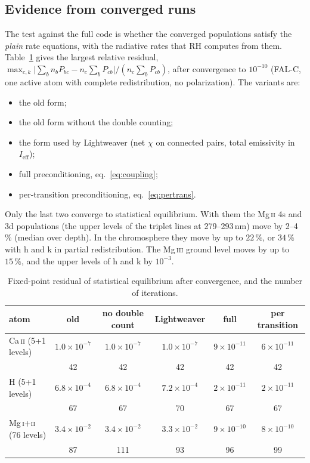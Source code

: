 \documentclass[11pt,a4paper]{article}
\begin{document}
\subsection{Evidence from converged runs}
The test against the full code is whether the converged populations
satisfy the \emph{plain} rate equations, with the radiative rates that
RH computes from them. Table~\ref{tab:coupling} gives the largest
relative residual,
$\max_{c,k}\bigl|\sum_b n_b P_{bc} - n_c\sum_b P_{cb}\bigr|/(n_c\sum_bP_{cb})$,
after convergence to $10^{-10}$ (FAL-C, one active atom with complete
redistribution, no polarization). The variants are:
\begin{itemize}
\item the old form;
\item the old form without the double counting;
\item the form used by Lightweaver (net $\chi$ on connected pairs, total
  emissivity in $I_\text{eff}$);
\item full preconditioning, eq.~\eqref{eq:coupling};
\item per-transition preconditioning, eq.~\eqref{eq:pertrans}.
\end{itemize}
Only the last two converge to statistical equilibrium. With them the
Mg\,\textsc{ii} 4s and 3d populations (the upper levels of the triplet lines
at 279--293\,nm) move by 2--4\,\% (median over depth). In the
chromosphere they move by up to $22\,\%$, or $34\,\%$ with h and k in partial
redistribution. The Mg\,\textsc{iii} ground level moves by up to $15\,\%$, and
the upper levels of h and k by $10^{-3}$.
\begin{table}[h]
\centering
\caption{Fixed-point residual of statistical equilibrium after convergence,
and the number of iterations.}
\label{tab:coupling}
\begin{tabular}{lccccc}
\toprule
atom & old & no double count & Lightweaver & full & per transition\\
\midrule
Ca\,\textsc{ii} (5+1 levels)  & $1.0\times10^{-7}$ & $1.0\times10^{-7}$ & $1.0\times10^{-7}$ & $9\times10^{-11}$ & $6\times10^{-11}$\\
                              & 42 & 42 & 42 & 42 & 42 \\
H (5+1 levels)                & $6.8\times10^{-4}$ & $6.8\times10^{-4}$ & $7.2\times10^{-4}$ & $2\times10^{-11}$ & $2\times10^{-11}$\\
                              & 67 & 67 & 70 & 67 & 67 \\
Mg\,\textsc{i}+\textsc{ii} (76 levels) & $3.4\times10^{-2}$ & $3.4\times10^{-2}$ & $3.3\times10^{-2}$ & $9\times10^{-10}$ & $8\times10^{-10}$\\
                              & 87 & 111 & 93 & 96 & 99 \\
\bottomrule
\end{tabular}
\end{table}
\end{document}
